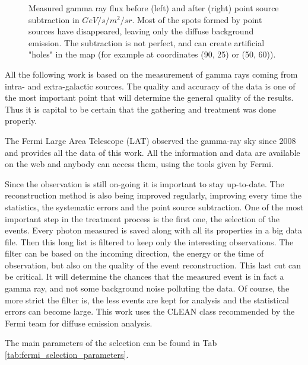 \begin{figure}[h]
\begin{minipage}[h]{0.45\textwidth}
	  \subcaption{}
	  \label{fig:data_ptsrc_subtracted}
  \end{minipage}
  \caption{Measured gamma ray flux before (left) and after (right) point source subtraction in $GeV/s/m^2/sr$. Most of the spots formed by point sources have disappeared, leaving only the diffuse background emission. The subtraction is not perfect, and can create artificial "holes" in the map (for example at coordinates (90, 25) or (50, 60)).}
  \label{fig:method_pass8} 
\end{figure}

All the following work is based on the measurement of gamma rays coming from intra- and extra-galactic sources. The quality and accuracy of the data is one of the most important point that will determine the general quality of the results. Thus it is capital to be certain that the gathering and treatment was done properly.

The Fermi Large Area Telescope (LAT) observed the gamma-ray sky since 2008 and provides all the data of this work.
All the information and data are available on the web and anybody can access them, using the tools given by Fermi.

Since the observation is still on-going it is important to stay up-to-date. The reconstruction method is also being improved regularly, improving every time the statistics, the systematic errors and the point source subtraction.
One of the most important step in the treatment process is the first one, the selection of the events. Every photon measured is saved along with all its properties in a big data file. Then this long list is filtered to keep only the interesting observations. The filter can be based on the incoming direction, the energy or the time of observation, but also on the quality of the event reconstruction. This last cut can be critical. It will determine the chances that the measured event is in fact a gamma ray, and not some background noise polluting the data. Of course, the more strict the filter is, the less events are kept for analysis and the statistical errors can become large. This work uses the CLEAN class recommended by the Fermi team for diffuse emission analysis. 

The main parameters of the selection can be found in Tab \ref{tab:fermi_selection_parameters}.

